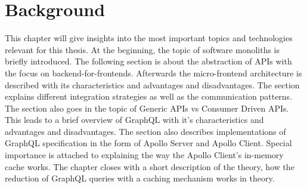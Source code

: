 \chapter{Background}

This chapter will give insights into the most important topics and technologies relevant for this thesis. At the beginning, the topic of software monoliths is briefly introduced. The following section is about the abstraction of APIs with the focus on backend-for-frontends. Afterwards the micro-frontend architecture is described with its characteristics and advantages and disadvantages. The section explains different integration strategies as well as the communication patterns. The section also goes in the topic of Generic APIs vs Consumer Driven APIs. This leads to a brief overview of GraphQL with it's characteristics and advantages and disadvantages. The section also describes implementations of GraphQL specification in the form of Apollo Server and Apollo Client. Special importance is attached to explaining the way the Apollo Client's in-memory cache works. The chapter closes with a short description of the theory, how the reduction of GraphQL queries with a caching mechanism works in theory.










